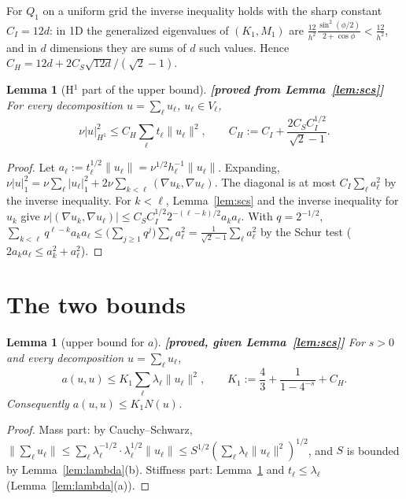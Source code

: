\documentclass[11pt,a4paper]{article}
\newtheorem{lemma}[theorem]{Lemma}
\theoremstyle{remark}
\begin{document}
For $Q_1$ on a uniform grid the inverse inequality holds with the sharp
constant $C_I=12d$: in 1D the generalized eigenvalues of $(K_1,M_1)$ are
$\frac{12}{h^2}\frac{\sin^2(\phi/2)}{2+\cos\phi}<\frac{12}{h^2}$, and in $d$ dimensions they are sums
of $d$ such values. Hence $C_H=12d+2C_S\sqrt{12d}/(\sqrt2-1)$.

\begin{lemma}[H$^1$ part of the upper bound]\label{lem:H1}\textbf{[proved from Lemma~\ref{lem:scs}]}
For every decomposition $u=\sum_\ell u_\ell$, $u_\ell\in V_\ell$,
\[
\nu|u|_{H^1}^2\le C_H\sum_\ell t_\ell\|u_\ell\|^2,\qquad C_H:=C_I+\frac{2C_SC_I^{1/2}}{\sqrt2-1}.
\]
\end{lemma}
\begin{proof}
Let $a_\ell:=t_\ell^{1/2}\|u_\ell\|=\nu^{1/2}h_\ell^{-1}\|u_\ell\|$. Expanding,
$\nu|u|_1^2=\nu\sum_\ell|u_\ell|_1^2+2\nu\sum_{k<\ell}(\nabla u_k,\nabla u_\ell)$. The diagonal is at most
$C_I\sum_\ell a_\ell^2$ by the inverse inequality. For $k<\ell$, Lemma~\ref{lem:scs} and the
inverse inequality for $u_k$ give
$\nu|(\nabla u_k,\nabla u_\ell)|\le C_SC_I^{1/2}2^{-(\ell-k)/2}a_ka_\ell$. With $q=2^{-1/2}$,
$\sum_{k<\ell}q^{\ell-k}a_ka_\ell\le\big(\sum_{j\ge1}q^j\big)\sum_\ell a_\ell^2=\frac1{\sqrt2-1}\sum_\ell a_\ell^2$ by the
Schur test ($2a_ka_\ell\le a_k^2+a_\ell^2$).
\end{proof}

\section{The two bounds}

\begin{lemma}[upper bound for $a$]\label{lem:upper}\textbf{[proved, given Lemma~\ref{lem:scs}]}
For $s>0$ and every decomposition $u=\sum_\ell u_\ell$,
\[
a(u,u)\le K_1\sum_\ell\lambda_\ell\|u_\ell\|^2,\qquad K_1:=\frac43+\frac1{1-4^{-s}}+C_H .
\]
Consequently $a(u,u)\le K_1N(u)$.
\end{lemma}
\begin{proof}
Mass part: by Cauchy--Schwarz,
$\|\sum_\ell u_\ell\|\le\sum_\ell\lambda_\ell^{-1/2}\cdot\lambda_\ell^{1/2}\|u_\ell\|\le S^{1/2}(\sum_\ell\lambda_\ell\|u_\ell\|^2)^{1/2}$, and $S$ is
bounded by Lemma~\ref{lem:lambda}(b). Stiffness part: Lemma~\ref{lem:H1} and
$t_\ell\le\lambda_\ell$ (Lemma~\ref{lem:lambda}(a)).
\end{proof}
\end{document}

